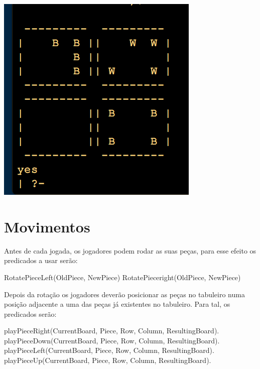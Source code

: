 \documentclass[a4paper]{article}
\begin{document}
\includegraphics[scale=0.5]{../printscreens/intermediate_board.png} \linebreak

\section{Movimentos}

Antes de cada jogada, os jogadores podem rodar as suas peças, para esse efeito os predicados a usar serão:

RotatePieceLeft(OldPiece, NewPiece)
RotatePieceright(OldPiece, NewPiece)

Depois da rotação os jogadores deverão posicionar as peças no tabuleiro numa posição adjacente a uma das peças já existentes no tabuleiro. Para tal, os predicados serão:

playPieceRight(CurrentBoard, Piece, Row, Column, ResultingBoard).
playPieceDown(CurrentBoard, Piece, Row, Column, ResultingBoard).
playPieceLeft(CurrentBoard, Piece, Row, Column, ResultingBoard).
playPieceUp(CurrentBoard, Piece, Row, Column, ResultingBoard).
\end{document}
